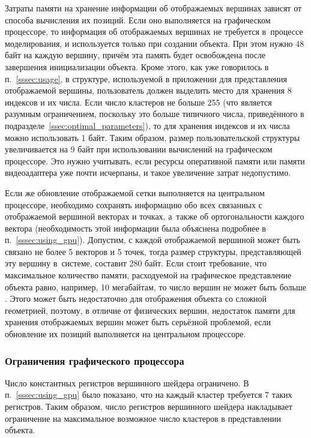 \documentclass[a4paper, 14pt, titlepage]{extarticle}
\newcommand{\num}[1]{\numprint{#1}}
\begin{document}
        Затраты памяти на хранение информации об отображаемых вершинах зависят от способа вычисления
        их позиций. Если оно выполняется на графическом процессоре, то информация об отображаемых
        вершинах не требуется в~процессе моделирования, и используется только при создании объекта.
        При этом нужно 48 байт на каждую вершину, причём эта память будет освобождена после
        завершения инициализации объекта. Кроме этого, как уже говорилось в п.~\ref{sssec:usage},
        в структуре, используемой в приложении для представления отображаемой вершины, пользователь
        должен выделить место для хранения 8 индексов и их числа. Если число кластеров не больше
        255 (что является разумным ограничением, поскольку это больше типичного числа, приведённого
        в подразделе~\ref{ssec:optimal_parameters}),
        то для хранения индексов и их числа можно использовать 1 байт. Таким образом,
        размер пользовательской структуры увеличивается на 9 байт при использовании вычислений на
        графическом процессоре. Это нужно учитывать, если ресурсы оперативной памяти или памяти
        видеоадаптера уже почти исчерпаны, и такое увеличение затрат недопустимо.

        Если же обновление отображаемой сетки выполняется на центральном процессоре, необходимо
        сохранять информацию обо всех связанных с отображаемой вершиной векторах и точках, а~также об
        ортогональности каждого вектора (необходимость этой информации была объяснена подробнее в
        п.~\ref{sssec:using_gpu}). Допустим, с каждой отображаемой вершиной может быть связано
        не более 5 векторов и 5 точек, тогда размер структуры, представляющей эту вершину в~системе,
        составит 280 байт. Если стоит требование, что максимальное количество памяти, расходуемой на
        графическое представление объекта равно, например, 10 мегабайтам, то число вершин не может
        быть больше \num{35714}. Этого может быть недостаточно для отображения объекта со сложной
        геометрией, поэтому, в отличие от физических вершин, недостаток памяти для хранения
        отображаемых вершин может быть серьёзной проблемой, если обновление их позиций выполняется
        на центральном процессоре.

      \subsubsection{Ограничения графического процессора}

        Число константных регистров вершинного шейдера ограничено. В п.~\ref{sssec:using_gpu} было
        показано, что на каждый кластер требуется 7 таких регистров. Таким образом, число регистров
        вершинного шейдера накладывает ограничение на максимальное возможное число кластеров в
        представлении объекта.
\end{document}
